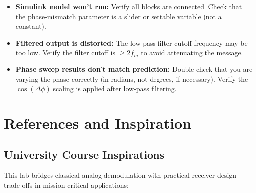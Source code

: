\documentclass[11pt,letterpaper]{article}
\begin{document}
\begin{itemize}
    \item \textbf{Simulink model won't run:} Verify all blocks are connected. Check that the phase-mismatch parameter is a slider or settable variable (not a constant).
    \item \textbf{Filtered output is distorted:} The low-pass filter cutoff frequency may be too low. Verify the filter cutoff is $\geq 2 f_m$ to avoid attenuating the message.
    \item \textbf{Phase sweep results don't match prediction:} Double-check that you are varying the phase correctly (in radians, not degrees, if necessary). Verify the $\cos(\Delta \phi)$ scaling is applied after low-pass filtering.
\end{itemize}

\clearpage

\section*{References and Inspiration}

\subsection*{University Course Inspirations}

This lab bridges classical analog demodulation with practical receiver design trade-offs in mission-critical applications:
\end{document}
